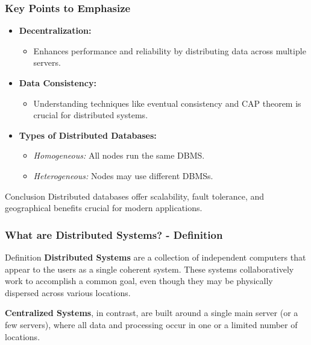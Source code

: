 \documentclass[aspectratio=169]{beamer}
\begin{document}
\begin{frame}[fragile]
    \frametitle{Key Points to Emphasize}
    \begin{itemize}
        \item \textbf{Decentralization:} 
            \begin{itemize}
                \item Enhances performance and reliability by distributing data across multiple servers.
            \end{itemize}
        
        \item \textbf{Data Consistency:} 
            \begin{itemize}
                \item Understanding techniques like eventual consistency and CAP theorem is crucial for distributed systems.
            \end{itemize}
        
        \item \textbf{Types of Distributed Databases:} 
            \begin{itemize}
                \item \textit{Homogeneous:} All nodes run the same DBMS.
                \item \textit{Heterogeneous:} Nodes may use different DBMSs.
            \end{itemize}
    \end{itemize}
    
    \begin{block}{Conclusion}
        Distributed databases offer scalability, fault tolerance, and geographical benefits crucial for modern applications.
    \end{block}
\end{frame}

\begin{frame}[fragile]
    \frametitle{What are Distributed Systems? - Definition}
    \begin{block}{Definition}
        \textbf{Distributed Systems} are a collection of independent computers that appear to the users as a single coherent system. These systems collaboratively work to accomplish a common goal, even though they may be physically dispersed across various locations.
        
        \textbf{Centralized Systems}, in contrast, are built around a single main server (or a few servers), where all data and processing occur in one or a limited number of locations.
    \end{block}
\end{frame}
\end{document}
